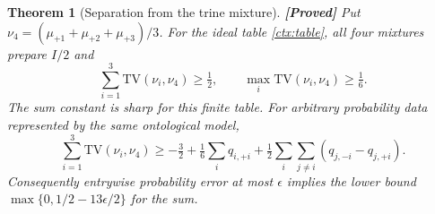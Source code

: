 \documentclass[11pt,a4paper]{article}
\newtheorem{theorem}{Theorem}[section]
\theoremstyle{definition}
\theoremstyle{remark}\newtheorem{remark}[theorem]{Remark}
\newcommand{\status}[1]{\textbf{[#1]}\quad}
\newcommand{\TV}{\mathrm{TV}}
\begin{document}
\begin{theorem}[Separation from the trine mixture]\label{ctx:sum}
\status{Proved}
Put $\nu_4=(\mu_{+1}+\mu_{+2}+\mu_{+3})/3$. For the ideal table
\eqref{ctx:table}, all four mixtures prepare $I/2$ and
\begin{equation}\label{ctx:sumhalf}
 \sum_{i=1}^3\TV(\nu_i,\nu_4)\ge\tfrac12,
 \qquad \max_i\TV(\nu_i,\nu_4)\ge\tfrac16.
\end{equation}
The sum constant is sharp for this finite table. For arbitrary probability
data represented by the same ontological model,
\begin{equation}\label{ctx:sumrobust}
 \sum_{i=1}^3\TV(\nu_i,\nu_4)\ge
 -\tfrac32+\tfrac16\sum_iq_{i,+i}
 +\tfrac12\sum_i\sum_{j\ne i}(q_{j,-i}-q_{j,+i}).
\end{equation}
Consequently entrywise probability error at most $\epsilon$ implies the
lower bound $\max\{0,1/2-13\epsilon/2\}$ for the sum.
\end{theorem}
\end{document}
